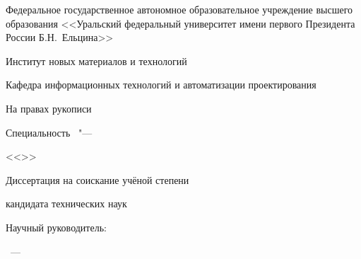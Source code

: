 \thispagestyle{empty}

\begin{center}
Федеральное государственное автономное образовательное учреждение высшего образования
<<Уральский федеральный университет
имени первого Президента России Б.Н.~Ельцина>>

Институт новых материалов и технологий

Кафедра информационных технологий и автоматизации проектирования
\end{center}
%
\vspace{0pt plus4fill} %
\begin{flushright}
На правах рукописи

\end{flushright}
%
\vspace{0pt plus6fill} %
\begin{center}
{\large
\theseAuthor}
\end{center}
%
\vspace{0pt plus1fill} %
\begin{center}
\textbf {\large %
\theseTitle}

\vspace{0pt plus2fill} %
{%
Специальность
\theseCode\ "---

<<\theseCodeDesq>>
}

\vspace{0pt plus2fill} %
Диссертация на соискание учёной степени

кандидата технических наук
\end{center}
%
\vspace{0pt plus4fill} %
\begin{flushright}

Научный руководитель:

\theseSvRegalia

\theseSupervisor

\end{flushright}

\vspace{0pt plus4fill} %
{\centering
\theseCity~---
\theseYear
\par}

\clearpage
